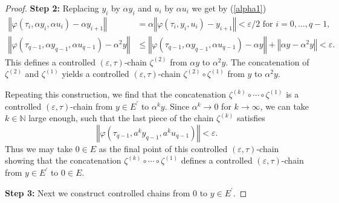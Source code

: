 \documentclass{siamltex}%
\begin{document}
\begin{proof}
\textbf{Step 2: }Replacing $y_{i}$ by $\alpha y_{i}$ and $u_{i}$ by $\alpha
u_{i}$ we get by (\ref{alpha1})%
\begin{align*}
\left\Vert \varphi(\tau_{i},\alpha y_{i},\alpha u_{i})-\alpha y_{i+1}%
\right\Vert  &  =\alpha\left\Vert \varphi(\tau_{i},y_{i},u_{i})-y_{i+1}%
\right\Vert <\varepsilon/2\text{ for }i=0,\ldots,q-1,\\
\left\Vert \varphi(\tau_{q-1},\alpha y_{q-1},\alpha u_{q-1})-\alpha
^{2}y\right\Vert  &  \leq\left\Vert \varphi(\tau_{q-1},\alpha y_{q-1},\alpha
u_{q-1})-\alpha y\right\Vert +\left\Vert \alpha y-\alpha^{2}y\right\Vert
<\varepsilon.
\end{align*}
This defines a controlled $(\varepsilon,\tau)$-chain $\zeta^{(2)}$ from
$\alpha y$ to $\alpha^{2}y$. The concatenation of $\zeta^{(2)}$ and
$\zeta^{(1)}$ yields a controlled $(\varepsilon,\tau)$-chain $\zeta^{(2)}%
\circ\zeta^{(1)}$ from $y$ to $\alpha^{2}y$.

Repeating this construction, we find that the concatenation $\zeta^{(k)}%
\circ\cdots\circ\zeta^{(1)}$ is a controlled $(\varepsilon,\tau)$-chain from
$y\in E^{\prime}$ to $\alpha^{k}y$. Since $\alpha^{k}\rightarrow0$ for
$k\rightarrow\infty$, we can take $k\in\mathbb{N}$ large enough, such that the
last piece of the chain $\zeta^{(k)}$ satisfies%
\[
\left\Vert \varphi(\tau_{q-1},a^{k}y_{q-1},a^{k}u_{q-1})\right\Vert
<\varepsilon.
\]
Thus we may take $0\in E$ as the final point of this controlled $(\varepsilon
,\tau)$-chain showing that the concatenation $\zeta^{(k)}\circ\cdots\circ
\zeta^{(1)}$ defines a controlled $(\varepsilon,\tau)$-chain from $y\in
E^{\prime}$ to $0\in E$.

\textbf{Step 3:} Next we construct controlled chains from $0$ to $y\in
E^{\prime}$.


\end{proof}
\end{document}
